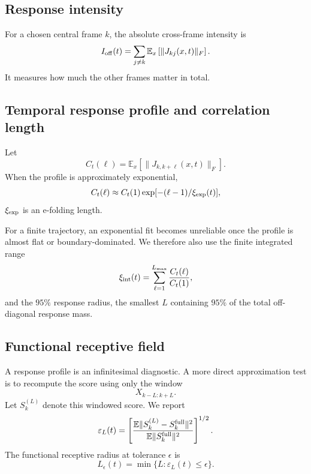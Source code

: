 \documentclass[11pt,a4paper]{article}
\newcommand{\E}{\mathbb{E}}
\begin{document}
\subsection{Response intensity}

For a chosen central frame $k$, the absolute cross-frame intensity is
\begin{equation}
 I_{\rm off}(t)
 =\sum_{j\ne k}\E_x\left[\|J_{kj}(x,t)\|_F\right].
 \label{eq:intensity}
\end{equation}
It measures how much the other frames matter in total.

\subsection{Temporal response profile and correlation length}

Let
\begin{equation}
 C_t(\ell)=\E_x\left[\|J_{k,k+\ell}(x,t)\|_F\right].
 \label{eq:response-profile}
\end{equation}
When the profile is approximately exponential,
\[
 C_t(\ell)\approx C_t(1)\exp[-(\ell-1)/\xi_{\rm exp}(t)],
\]
$\xi_{\rm exp}$ is an e-folding length.

For a finite trajectory, an exponential fit becomes unreliable once the profile is almost flat or boundary-dominated. We therefore also use the finite integrated range
\begin{equation}
 \xi_{\rm int}(t)=\sum_{\ell=1}^{L_{\max}}
 \frac{C_t(\ell)}{C_t(1)},
 \label{eq:integrated-range}
\end{equation}
and the $95\%$ response radius, the smallest $L$ containing $95\%$ of the total off-diagonal response mass.

\subsection{Functional receptive field}

A response profile is an infinitesimal diagnostic. A more direct approximation test is to recompute the score using only the window
\[
 X_{k-L:k+L}.
\]
Let $S_k^{(L)}$ denote this windowed score. We report
\begin{equation}
 \varepsilon_L(t)=
 \left[
 \frac{\E\|S_k^{(L)}-S_k^{\rm full}\|^2}
 {\E\|S_k^{\rm full}\|^2}
 \right]^{1/2}.
 \label{eq:window-error}
\end{equation}
The functional receptive radius at tolerance $\epsilon$ is
\begin{equation}
 L_\epsilon(t)=\min\{L:\varepsilon_L(t)\le\epsilon\}.
 \label{eq:receptive-radius}
\end{equation}
\end{document}
